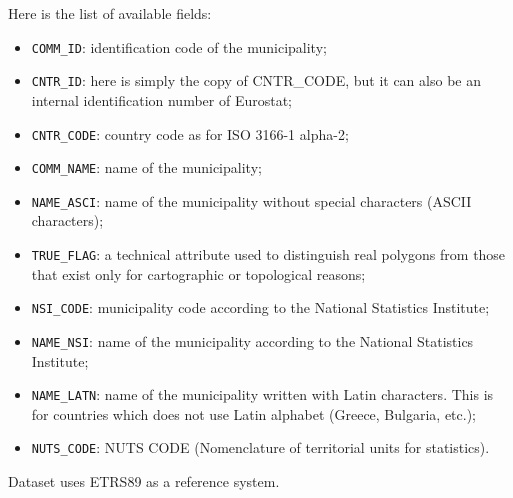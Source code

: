 Here is the list of available fields:
\begin{itemize}
	\item \texttt{COMM\_ID}: identification code of the municipality;
	\item \texttt{CNTR\_ID}: here is simply the copy of CNTR\_CODE, but it can also be an internal identification number of Eurostat;
	\item \texttt{CNTR\_CODE}: country code as for ISO 3166-1 alpha-2;
	\item \texttt{COMM\_NAME}: name of the municipality;
	\item \texttt{NAME\_ASCI}: name of the municipality without special characters (ASCII characters);
	\item \texttt{TRUE\_FLAG}: a technical attribute used to distinguish real polygons from those that exist only for cartographic or topological reasons;
	\item \texttt{NSI\_CODE}: municipality code according to the National Statistics Institute;
	\item \texttt{NAME\_NSI}: name of the municipality according to the National Statistics Institute;
	\item \texttt{NAME\_LATN}: name of the municipality written with Latin characters. This is for countries which does not use Latin alphabet (Greece, Bulgaria, etc.);
	\item \texttt{NUTS\_CODE}: NUTS CODE (Nomenclature of territorial units for statistics).
\end{itemize}

Dataset uses ETRS89 as a reference system.









